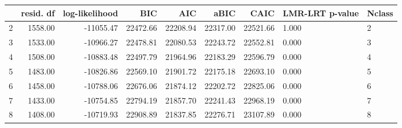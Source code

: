 \begin{table}[ht]
\centering
\begin{tabular}{rrrrrrrll}
  \hline
 & resid. df & log-likelihood & BIC & AIC & aBIC & CAIC & LMR-LRT p-value & Nclass \\ 
  \hline
2 & 1558.00 & -11055.47 & 22472.66 & 22208.94 & 22317.00 & 22521.66 & 1.000 & 2 \\ 
  3 & 1533.00 & -10966.27 & 22478.81 & 22080.53 & 22243.72 & 22552.81 & 0.000 & 3 \\ 
  4 & 1508.00 & -10883.48 & 22497.79 & 21964.96 & 22183.29 & 22596.79 & 0.000 & 4 \\ 
  5 & 1483.00 & -10826.86 & 22569.10 & 21901.72 & 22175.18 & 22693.10 & 0.000 & 5 \\ 
  6 & 1458.00 & -10788.06 & 22676.06 & 21874.12 & 22202.72 & 22825.06 & 0.000 & 6 \\ 
  7 & 1433.00 & -10754.85 & 22794.19 & 21857.70 & 22241.43 & 22968.19 & 0.000 & 7 \\ 
  8 & 1408.00 & -10719.93 & 22908.89 & 21837.85 & 22276.71 & 23107.89 & 0.000 & 8 \\ 
   \hline
\end{tabular}
\end{table}

